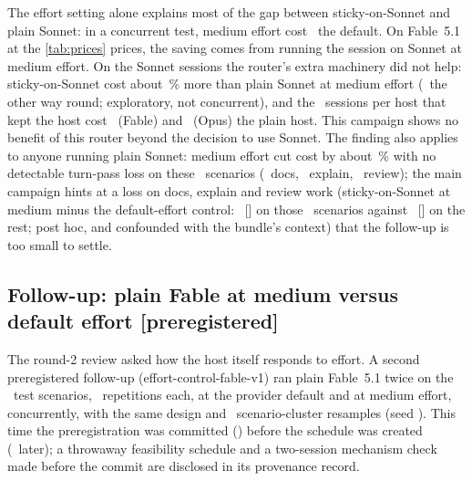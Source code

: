 \begin{keyidea}
The effort setting alone explains most of the gap between sticky-on-Sonnet and plain Sonnet: in a concurrent test,
medium effort cost \EcRatio\X\ the default. On Fable~5.1 at the \cref{tab:prices} prices, the saving comes from
running the session on Sonnet at medium effort. On the Sonnet sessions the router's extra machinery did not help: sticky-on-Sonnet cost about \EcSecGapPct\,\% more
than plain Sonnet at medium effort (\EcSecRatio\ the other way round; exploratory, not concurrent), and the
\RvStickyHostNFable\ sessions per host that kept the host cost \RvStickyHostFableTwo\X\ (Fable) and
\RvStickyHostOpusTwo\X\ (Opus) the plain host. This campaign shows no benefit of this router beyond the decision to use
Sonnet. The finding also applies to anyone running plain Sonnet:
medium effort cut cost by about \EcCutPct\,\% with no detectable turn-pass loss on these \EcScen\ scenarios (\RvDocsTest\ docs, \RvExplainTest\ explain, \RvReviewTest\ review); the main campaign
hints at a loss on docs, explain and review work (sticky-on-Sonnet at medium minus the default-effort control:
\RvKTDtp\ [\RvKTDtpCI] on those \RvKTN\ scenarios against \RvRestDtp\ [\RvRestDtpCI] on the rest; post hoc, and
confounded with the bundle's context) that the follow-up is too small to settle.
\end{keyidea}

\subsection{Follow-up: plain Fable at medium versus default effort \texorpdfstring{[preregistered]}{[preregistered]}}\label{sec:effortfable}

The round-2 review asked how the host itself responds to effort. A second preregistered follow-up
(effort-control-fable-v1) ran plain Fable~5.1 twice on the \EcScen\ test scenarios, \EcReps\ repetitions each, at the
provider default and at medium effort, concurrently, with the same design and \EcResamples\ scenario-cluster resamples
(seed \EcSeed). This time the preregistration was committed (\code{\EfPreregSha}) before the schedule was created
(\EfScheduleAfter\ later); a throwaway feasibility schedule and a two-session mechanism check made before the commit
are disclosed in its provenance record.

\begin{table}[htbp]
\centering\small
\caption{Fable effort follow-up (evidence in the \texttt{2026-10-06-effort-control-fable} directory). Cost rows are
geometric-mean ratios of tools-normalized session cost; below 1 means the first arm is cheaper.}
\label{tab:effortfable}

\end{table}

